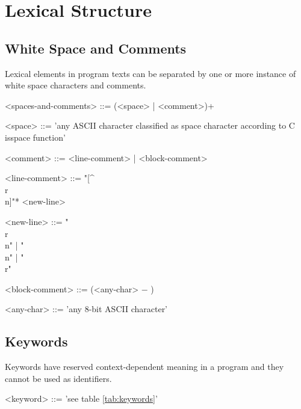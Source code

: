 \documentclass[a4paper,oneside,11pt]{article}
\begin{document}
\section{Lexical Structure}

\subsection{White Space and Comments}

Lexical elements in program texts can be separated by one or more instance of white space characters and comments.

\begin{grammar}
<spaces-and-comments> ::= (<space> | <comment>)+

<space> ::= 'any ASCII character classified as space character according to C isspace function'

<comment> ::= <line-comment> | <block-comment>

<line-comment> ::= \lit*{//} "[^\\r\\n]"* <new-line>

<new-line> ::= "\\r\\n" | "\\n" | "\\r"

<block-comment> ::= \lit{/*} (<any-char> $-$ \lit{*/}) \lit{*/}

<any-char> ::= 'any 8-bit ASCII character'

\end{grammar}

\subsection{Keywords}

Keywords have reserved context-dependent meaning in a program and they cannot be used as identifiers.

\begin{grammar}
\label{keyword}<keyword> ::= 'see table \ref{tab:keywords}'
\end{grammar}
\end{document}
